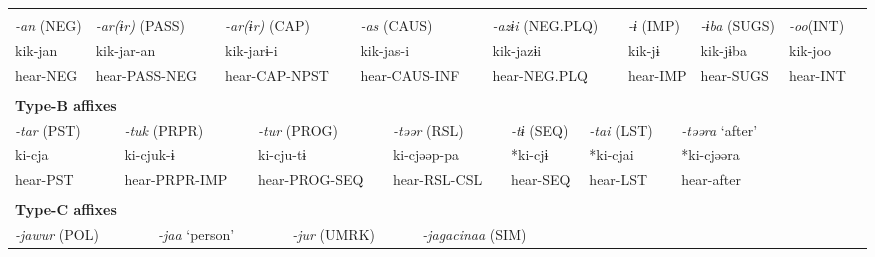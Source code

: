 \tabletail{}
\tablelasttail{}
\begin{tabularx}{\textwidth}{XXXXXXXXXXXXXXXXXXXXXXX}
\lsptoprule
\multicolumn{23}{X}{{\bfseries Type-A affixes}}\\
{ \textit{{}-an} (NEG)} & \multicolumn{4}{X}{{ \textit{{}-ar(ɨr)} (PASS)}} & \multicolumn{4}{X}{{ \textit{{}-ar(ɨr)} (CAP)}} & \multicolumn{4}{X}{{ \textit{{}-as} (CAUS)}} & \multicolumn{5}{X}{{ \textit{{}-azɨi} (NEG.PLQ)}} & \multicolumn{2}{X}{{ \textit{{}-ɨ} (IMP)}} & { \textit{{}-ɨba} (SUGS)} & { \textit{{}-oo}(INT)} & \\
{ kik-jan} & \multicolumn{4}{X}{{ kik-jar-an}} & \multicolumn{4}{X}{{ kik-jarɨ-i}} & \multicolumn{4}{X}{{ kik-jas-i}} & \multicolumn{5}{X}{{ kik-jazɨi}} & \multicolumn{2}{X}{{ kik-jɨ}} & { kik-jɨba} & { kik-joo} & \\
hear-NEG & \multicolumn{4}{X}{hear-PASS-NEG} & \multicolumn{4}{X}{hear-CAP-NPST} & \multicolumn{4}{X}{hear-CAUS-INF} & \multicolumn{5}{X}{hear-NEG.PLQ} & \multicolumn{2}{X}{hear-IMP} & hear-SUGS & hear-INT & \\
\multicolumn{23}{X}{}\\
\multicolumn{23}{X}{{\bfseries Type-B affixes}}\\
\multicolumn{2}{X}{{ \textit{{}-tar} (PST)}} & \multicolumn{4}{X}{{ \textit{{}-tuk} (PRPR)}} & \multicolumn{4}{X}{{ \textit{{}-tur} (PROG)}} & \multicolumn{4}{X}{{ \textit{{}-təər} (RSL)}} & \multicolumn{3}{X}{{ \textit{{}-tɨ} (SEQ)}} & \multicolumn{2}{X}{{ \textit{{}-tai} (LST)}} & \multicolumn{4}{X}{{ \textit{{}-təəra} ‘after’}}\\
\multicolumn{2}{X}{{ ki-cja}} & \multicolumn{4}{X}{{ ki-cjuk-ɨ}} & \multicolumn{4}{X}{{ ki-cju-tɨ}} & \multicolumn{4}{X}{{ ki-cjəəp-pa}} & \multicolumn{3}{X}{{ *ki-cjɨ}} & \multicolumn{2}{X}{{ *ki-cjai}} & \multicolumn{4}{X}{{ *ki-cjəəra}}\\
\multicolumn{2}{X}{hear-PST} & \multicolumn{4}{X}{hear-PRPR-IMP} & \multicolumn{4}{X}{hear-PROG-SEQ} & \multicolumn{4}{X}{hear-RSL-CSL} & \multicolumn{3}{X}{hear-SEQ} & \multicolumn{2}{X}{hear-LST} & \multicolumn{4}{X}{{ hear-after}}\\
\multicolumn{2}{X}{} & \multicolumn{4}{X}{} & \multicolumn{4}{X}{} & \multicolumn{4}{X}{} & \multicolumn{3}{X}{} & \multicolumn{2}{X}{} & \multicolumn{4}{X}{}\\
\multicolumn{23}{X}{{\bfseries Type-C affixes}}\\
\multicolumn{3}{X}{{ \textit{{}-jawur} (POL)}} & \multicolumn{4}{X}{{ \textit{{}-jaa} ‘person’}} & \multicolumn{4}{X}{{ \textit{{}-jur} (UMRK)}} & \multicolumn{4}{X}{{ \textit{{}-jagacinaa} (SIM)}} & \multicolumn{8}{X}{}\\

\end{tabularx}
